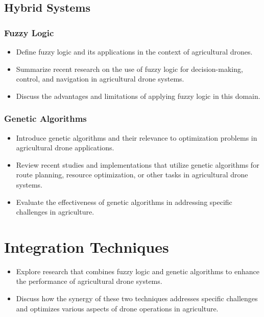 \documentclass{IEEEtran}
\begin{document}
\subsection{Hybrid Systems}
    \subsubsection{Fuzzy Logic}
        \begin{itemize}
            \item Define fuzzy logic and its applications in the context of agricultural drones.
            \item Summarize recent research on the use of fuzzy logic for decision-making, control, and navigation in agricultural drone systems.
            \item Discuss the advantages and limitations of applying fuzzy logic in this domain.
        \end{itemize}
    \subsubsection{Genetic Algorithms}
        \begin{itemize}
            \item Introduce genetic algorithms and their relevance to optimization problems in agricultural drone applications.
            \item Review recent studies and implementations that utilize genetic algorithms for route planning, resource optimization, or other tasks in agricultural drone systems.
            \item Evaluate the effectiveness of genetic algorithms in addressing specific challenges in agriculture.
        \end{itemize}

\section{Integration Techniques}
    \begin{itemize}
        \item     Explore research that combines fuzzy logic and genetic algorithms to enhance the performance of agricultural drone systems.
        \item Discuss how the synergy of these two techniques addresses specific challenges and optimizes various aspects of drone operations in agriculture.
    \end{itemize}
\end{document}

